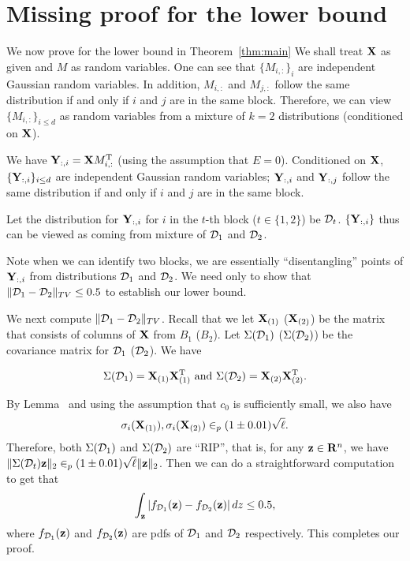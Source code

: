 \section{Missing proof for the lower bound}\label{asec:lower}
We now prove for the lower bound in Theorem~\ref{thm:main}
We shall treat $\mathbf{X}$ as given and $M$ as random variables. One can see that $\{M_{i, :}\}_i$ are independent Gaussian random variables. In addition, $M_{i, :}$ and $M_{j, :}$ follow the same distribution if and only if $i$ and $j$ are in the same block. Therefore, we can view $\{M_{i, :}\}_{i \leq d}$ as random variables from a mixture of $k = 2$ distributions (conditioned on $\mathbf{X}$). 

We have $\mathbf{Y}_{:, i} = \mathbf{X} M^{\mathrm{T}}_{i, :}$ (using the assumption that $E = 0$). Conditioned on $\mathbf{X}$, $\{\mathbf{Y}_{:, i}\}_{i \leq d} $ are independent Gaussian random variables; $\mathbf{Y}_{:, i}$ and $\mathbf{Y}_{:, j}$ follow the same distribution if and only if $i$ and $j$ are in the same block. 

Let the distribution for $\mathbf{Y}_{:, i}$ for $i$ in the $t$-th block ($t \in \{1, 2\}$) be $\mathcal{D}_t$. $\{\mathbf{Y}_{:, i}\}$ thus can be viewed as coming from mixture of $\mathcal{D}_1$ and $\mathcal{D}_2$. 

Note when we can identify two blocks, we are essentially ``disentangling'' points of $\mathbf{Y}_{:, i}$ from distributions $\mathcal{D}_1$ and $\mathcal{D}_2$. We need only to show that 
$\|\mathcal{D}_1 - \mathcal{D}_2\|_{TV} \leq 0.5$ to establish our lower bound.


We next compute $\|\mathcal{D}_1 - \mathcal{D}_2\|_{TV}$. Recall that we let $\mathbf{X}_{(1)}$ ($\mathbf{X}_{(2)}$) be the matrix that consists of columns of $\mathbf{X}$ from $B_1$ ($B_2$). Let $\Sigma(\mathcal{D}_1)$ ($\Sigma(\mathcal{D}_2)$) be the covariance matrix for $\mathcal{D}_1$ ($\mathcal{D}_2$). We have 

\begin{equation}
    \Sigma(\mathcal{D}_1) = \mathbf{X}_{(1)}\mathbf{X}^{\mathrm{T}}_{(1)} \mbox{ and } \Sigma(\mathcal{D}_2) = \mathbf{X}_{(2)}\mathbf{X}^{\mathrm{T}}_{(2)}. 
\end{equation}

By Lemma~\cite{lem:randommat} and using the assumption that $c_0$ is sufficiently small, we also have
\begin{equation}
    \sigma_i(\mathbf{X}_{(1)}), \sigma_{i}(\mathbf{X}_{(2)}) \in_p (1\pm 0.01)\sqrt{\ell}. 
\end{equation}
Therefore, both $\Sigma(\mathcal{D}_1)$ and $\Sigma(\mathcal{D}_2)$ are ``RIP'', that is, for any $\mathbf{z} \in \mathbf{R}^{n}$, we have $\|\Sigma(\mathcal{D}_t)\mathbf{z}\|_2 \in_p (1\pm 0.01)\sqrt{\ell} \|\mathbf{z}\|_2$. Then we can do a straightforward computation to get that
\begin{equation}
    \int_{\mathbf{z}}\left|f_{\mathcal{D}_1}(\mathbf{z}) - f_{\mathcal{D}_2}(\mathbf{z})\right| dz \leq 0.5, 
\end{equation}
where $f_{\mathcal{D}_1}(\mathbf{z})$ and $f_{\mathcal{D}_2}(\mathbf{z})$ are pdfs of $\mathcal{D}_1$ and $\mathcal{D}_2$ respectively. This completes our proof. 

